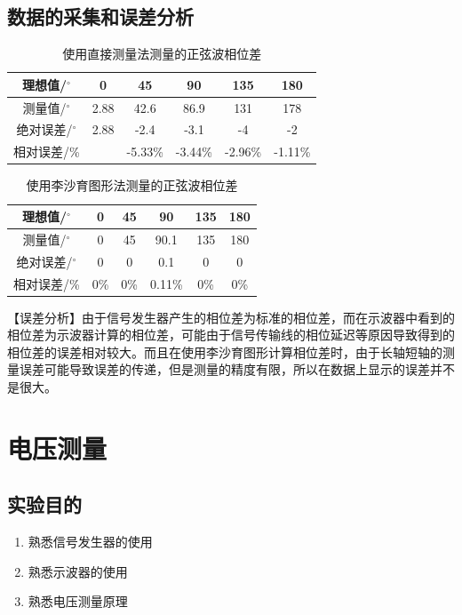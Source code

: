 \documentclass[12pt]{article}
\begin{document}
\subsection{数据的采集和误差分析}
\begin{table}[htbp]
  \centering
  \caption{使用直接测量法测量的正弦波相位差}
    \begin{tabular}{|c|c|c|c|c|c|}
    \hline
    理想值/$^{\circ}$ & 0 & 45 & 90 & 135 & 180 \\
    \hline
    测量值/$^{\circ}$ & 2.88 & 42.6 & 86.9 & 131 & 178 \\
    \hline
    绝对误差/$^{\circ}$ & 2.88 & -2.4 & -3.1 & -4 & -2  \\
    \hline
    相对误差/\% &   & -5.33\% & -3.44\% & -2.96\% & -1.11\%  \\
    \hline
    \end{tabular}%
  \label{tab:addlabel}%
\end{table}%

\begin{table}[htbp]
  \centering
  \caption{使用李沙育图形法测量的正弦波相位差}
    \begin{tabular}{|c|c|c|c|c|c|}
    \hline
    理想值/$^{\circ}$ & 0 & 45 & 90 & 135 & 180 \\
    \hline
    测量值/$^{\circ}$ & 0 & 45 & 90.1 & 135 & 180 \\
    \hline
    绝对误差/$^{\circ}$ & 0 & 0 & 0.1 & 0 & 0 \\
    \hline
    相对误差/\%& 0\% & 0\% & 0.11\% & 0\% & 0\%\\
    \hline
    \end{tabular}%
  \label{tab:addlabel}%
\end{table}%
【误差分析】由于信号发生器产生的相位差为标准的相位差，而在示波器中看到的相位差为示波器计算的相位差，可能由于信号传输线的相位延迟等原因导致得到的相位差的误差相对较大。而且在使用李沙育图形计算相位差时，由于长轴短轴的测量误差可能导致误差的传递，但是测量的精度有限，所以在数据上显示的误差并不是很大。
\newpage
\section{电压测量}
\setcounter{equation}{0}
\setcounter{table}{0}
\setcounter{figure}{0}
\subsection{实验目的}
\begin{enumerate}
  \item 熟悉信号发生器的使用
\item 熟悉示波器的使用
\item 熟悉电压测量原理
\end{enumerate}
\end{document}

